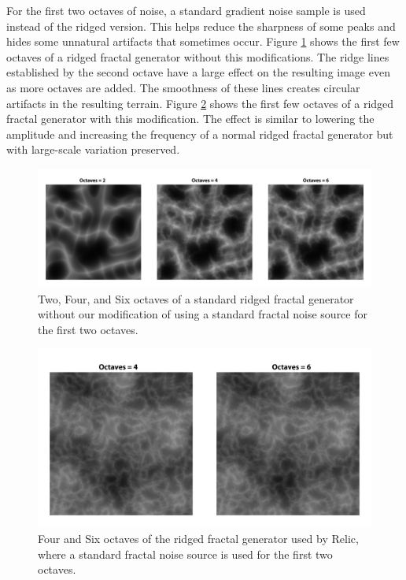 For the first two octaves of noise, a standard gradient noise sample is used instead of the ridged version.
This helps reduce the sharpness of some peaks and hides some unnatural artifacts that sometimes occur.
Figure \ref{fig:original_ridged} shows the first few octaves of a ridged fractal generator without this modifications.
The ridge lines established by the second octave have a large effect on the resulting image even as more octaves are added.
The smoothness of these lines creates circular artifacts in the resulting terrain.
Figure \ref{fig:my_ridged} shows the first few octaves of a ridged fractal generator with this modification.
The effect is similar to lowering the amplitude and increasing the frequency of a normal ridged fractal generator but with large-scale variation preserved.

\begin{figure}
	\centering
		\includegraphics[width=1.0\textwidth]{figures/original_ridged}
	\caption{Two, Four, and Six octaves of a standard ridged fractal generator without our modification of using a standard fractal noise source for the first two octaves.}
	\label{fig:original_ridged}
\end{figure}

\begin{figure}
	\centering
		\includegraphics[width=1.0\textwidth]{figures/my_ridged}
	\caption{Four and Six octaves of the ridged fractal generator used by Relic, where a standard fractal noise source is used for the first two octaves.}
	\label{fig:my_ridged}
\end{figure}


